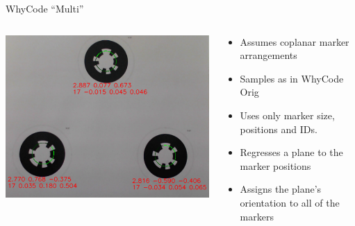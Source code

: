 \documentclass[aspectratio=169]{beamer}
\begin{document}
\begin{frame}{WhyCode ``Multi''}
	\begin{columns}
	\begin{column}{0.4\textwidth}
		\centering
		\includegraphics[width=\linewidth]{./images/cropped_whycode_3_8_jiri_example.png}
	\end{column}
	\begin{column}{0.6\textwidth}
	\begin{itemize}
		\item Assumes coplanar marker arrangements
		\item Samples as in WhyCode Orig
		\item Uses only marker size, positions and IDs.
		\item Regresses a plane to the marker positions
		\item Assigns the plane's orientation to all of the markers
	\end{itemize}
	\end{column}
	\end{columns}
\end{frame}
\end{document}
